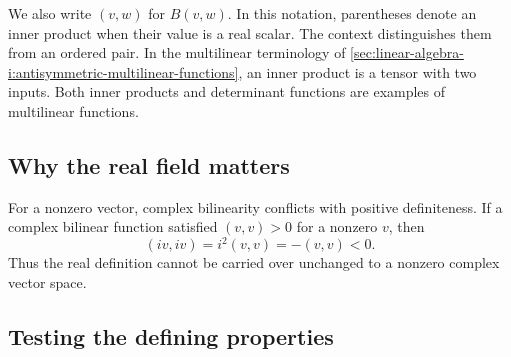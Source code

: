 We also write \((v,w)\) for \(B(v,w)\). In this notation,
parentheses denote an inner product when their value is a real scalar.
The context distinguishes them from an ordered pair.
In the multilinear terminology of
\autoref{sec:linear-algebra-i:antisymmetric-multilinear-functions}, an
inner product is a tensor with two inputs. Both inner products and
determinant functions are examples of multilinear functions.

\subsection{Why the real field matters}

For a nonzero vector, complex bilinearity conflicts with positive
definiteness. If a
complex bilinear function satisfied \((v,v)>0\) for a nonzero \(v\),
then
\[
  (iv,iv)=i^2(v,v)=-(v,v)<0.
\]
Thus the real definition cannot be carried over unchanged to a nonzero
complex vector space.

\subsection{Testing the defining properties}



